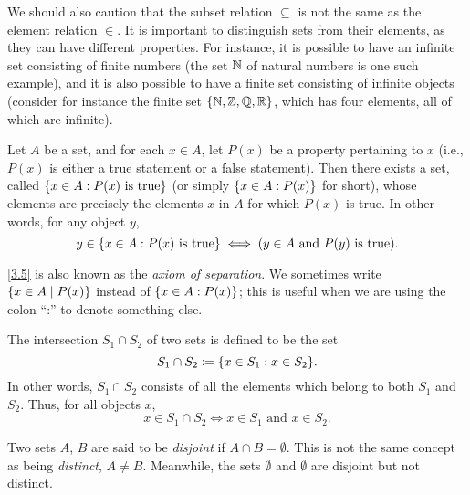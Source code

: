 \begin{rmk}\label{3.1.21}
	We should also caution that the subset relation \(\subseteq\) is not the same as the element relation \(\in\).
	It is important to distinguish sets from their elements, as they can have different properties.
	For instance, it is possible to have an infinite set consisting of finite numbers (the set \(\mathbb{N}\) of natural numbers is one such example), and it is also possible to have a finite set consisting of infinite objects
	(consider for instance the finite set \(\left\lbrace\mathbb{N}, \mathbb{Z}, \mathbb{Q}, \mathbb{R}\right\rbrace\), which has four elements, all of which are infinite).
\end{rmk}

\begin{ax}\label{3.5}
	Let \(A\) be a set, and for each \(x \in A\), let \(P(x)\) be a property pertaining to \(x\) (i.e., \(P(x)\) is either a true statement or a false statement).
	Then there exists a set, called \(\left\lbrace x \in A : P(x) \text{ is true}\right\rbrace\) (or simply \(\left\lbrace x \in A : P(x)\right\rbrace\) for short), whose elements are precisely the elements \(x\) in \(A\) for which \(P(x)\) is true.
	In other words, for any object \(y\),
	\[
		y \in \left\lbrace x \in A : P(x) \text{ is true}\right\rbrace \iff (y \in A \text{ and } P(y) \text{ is true}).
	\]
\end{ax}

\begin{note}
	\cref{3.5} is also known as the \emph{axiom of separation}.
	We sometimes write \(\left\lbrace x \in A \mid P(x)\right\rbrace\) instead of \(\left\lbrace x \in A : P(x)\right\rbrace\);
	this is useful when we are using the colon ``:'' to denote something else.
\end{note}

\setcounter{thm}{22}
\begin{defn}[Intersections]\label{3.1.23}
	The intersection \(S_1 \cap S_2\) of two sets is defined to be the set
	\[
		S_1 \cap S_2 \coloneqq \set{x \in S_1 : x \in S_2}.
	\]
	In other words, \(S_1 \cap S_2\) consists of all the elements which belong to both \(S_1\) and \(S_2\).
	Thus, for all objects \(x\),
	\[
		x \in S_1 \cap S_2 \iff x \in S_1 \text{ and } x \in S_2.
	\]
\end{defn}

\begin{note}
	Two sets \(A\), \(B\) are said to be \emph{disjoint} if \(A \cap B = \emptyset\).
	This is not the same concept as being \emph{distinct}, \(A \neq B\).
	Meanwhile, the sets \(\emptyset\) and \(\emptyset\) are disjoint but not distinct.
\end{note}

